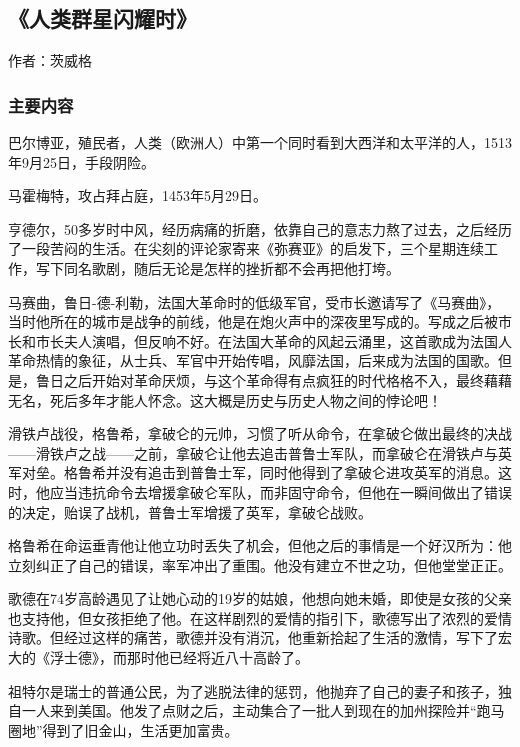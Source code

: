\subsection{《人类群星闪耀时》}
作者：茨威格

\subsubsection{主要内容}
\begin{itemize*}
	\item 巴尔博亚，殖民者，人类（欧洲人）中第一个同时看到大西洋和太平洋的人，1513年9月25日，手段阴险。
	\item 马霍梅特，攻占拜占庭，1453年5月29日。
	\item 亨德尔，50多岁时中风，经历病痛的折磨，依靠自己的意志力熬了过去，之后经历了一段苦闷的生活。在尖刻的评论家寄来《弥赛亚》的启发下，三个星期连续工作，写下同名歌剧，随后无论是怎样的挫折都不会再把他打垮。
	\item 马赛曲，鲁日-德-利勒，法国大革命时的低级军官，受市长邀请写了《马赛曲》，当时他所在的城市是战争的前线，他是在炮火声中的深夜里写成的。写成之后被市长和市长夫人演唱，但反响不好。在法国大革命的风起云涌里，这首歌成为法国人革命热情的象征，从士兵、军官中开始传唱，风靡法国，后来成为法国的国歌。但是，鲁日之后开始对革命厌烦，与这个革命得有点疯狂的时代格格不入，最终藉藉无名，死后多年才能人怀念。这大概是历史与历史人物之间的悖论吧！
	\item 滑铁卢战役，格鲁希，拿破仑的元帅，习惯了听从命令，在拿破仑做出最终的决战——滑铁卢之战——之前，拿破仑让他去追击普鲁士军队，而拿破仑在滑铁卢与英军对垒。格鲁希并没有追击到普鲁士军，同时他得到了拿破仑进攻英军的消息。这时，他应当违抗命令去增援拿破仑军队，而非固守命令，但他在一瞬间做出了错误的决定，贻误了战机，普鲁士军增援了英军，拿破仑战败。

格鲁希在命运垂青他让他立功时丢失了机会，但他之后的事情是一个好汉所为：他立刻纠正了自己的错误，率军冲出了重围。他没有建立不世之功，但他堂堂正正。

	\item 歌德在74岁高龄遇见了让她心动的19岁的姑娘，他想向她未婚，即使是女孩的父亲也支持他，但女孩拒绝了他。在这样剧烈的爱情的指引下，歌德写出了浓烈的爱情诗歌。但经过这样的痛苦，歌德并没有消沉，他重新拾起了生活的激情，写下了宏大的《浮士德》，而那时他已经将近八十高龄了。
	\item 祖特尔是瑞士的普通公民，为了逃脱法律的惩罚，他抛弃了自己的妻子和孩子，独自一人来到美国。他发了点财之后，主动集合了一批人到现在的加州探险并“跑马圈地”得到了旧金山，生活更加富贵。


\end{itemize*}
